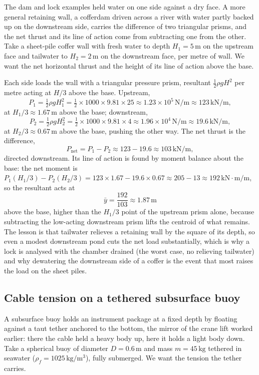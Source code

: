 The dam and lock examples held water on one side against a dry face. A more
general retaining wall, a cofferdam driven across a river with water partly
backed up on the downstream side, carries the difference of two triangular
prisms, and the net thrust and its line of action come from subtracting one
from the other. Take a sheet-pile coffer wall with fresh water to depth
$H_1 = 5\,\si{\meter}$ on the upstream face and tailwater to $H_2 = 2\,\si{
\meter}$ on the downstream face, per metre of wall. We want the net
horizontal thrust and the height of its line of action above the base.

Each side loads the wall with a triangular pressure prism, resultant
$\tfrac12\rho g H^2$ per metre acting at $H/3$ above the base. Upstream,
\[
P_1 = \tfrac12 \rho g H_1^2
= \tfrac12 \times 1000 \times 9.81 \times 25
\approx 1.23 \times 10^5\,\text{N/m}
\approx 123\,\text{kN/m},
\]
at $H_1/3 \approx 1.67\,\si{\meter}$ above the base; downstream,
\[
P_2 = \tfrac12 \rho g H_2^2
= \tfrac12 \times 1000 \times 9.81 \times 4
\approx 1.96 \times 10^4\,\text{N/m}
\approx 19.6\,\text{kN/m},
\]
at $H_2/3 \approx 0.67\,\si{\meter}$ above the base, pushing the other way.
The net thrust is the difference,
\[
P_{\text{net}} = P_1 - P_2 \approx 123 - 19.6 \approx 103\,\text{kN/m},
\]
directed downstream. Its line of action is found by moment balance about
the base: the net moment is $P_1 (H_1/3) - P_2 (H_2/3) = 123 \times 1.67 -
19.6 \times 0.67 \approx 205 - 13 \approx 192\,\text{kN}\cdot\text{m/m}$,
so the resultant acts at
\[
\bar{y} = \frac{192}{103} \approx 1.87\,\si{\meter}
\]
above the base, higher than the $H_1/3$ point of the upstream prism alone,
because subtracting the low-acting downstream prism lifts the centroid of
what remains. The lesson is that tailwater relieves a retaining wall by the
square of its depth, so even a modest downstream pond cuts the net load
substantially, which is why a lock is analysed with the chamber drained
(the worst case, no relieving tailwater) and why dewatering the downstream
side of a coffer is the event that most raises the load on the sheet piles.

\subsection{Cable tension on a tethered subsurface buoy}

A subsurface buoy holds an instrument package at a fixed depth by floating
against a taut tether anchored to the bottom, the mirror of the crane lift
worked earlier: there the cable held a heavy body up, here it holds a light
body down. Take a spherical buoy of diameter $D = 0.6\,\si{\meter}$ and mass
$m = 45\,\si{\kilogram}$ tethered in seawater ($\rho_f = 1025\,\si{
\kilogram\per\meter\cubed}$), fully submerged. We want the tension the
tether carries.

